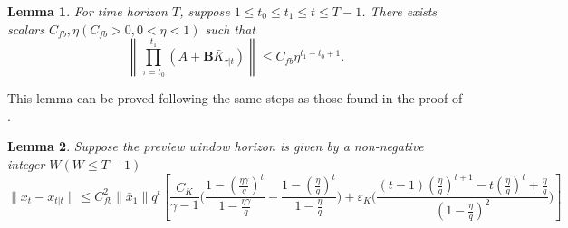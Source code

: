 \documentclass{article}
\newtheorem{lemma}{Lemma}
\begin{document}
\begin{lemma}\label{lemma:multGain}
    For time horizon $T$, suppose $1\leq t_{0} \leq t_{1}\leq t\leq T-1$. There exists scalars $C_{fb},\eta(C_{fb}>0,0<\eta<1)$ such that
    \begin{equation}
        \left \| \prod_{\tau=t_{0}}^{t_{1}}(A+\mathbf{B}\bar{K}_{\tau|t})  \right\| \leq C_{fb}\eta^{t_{1}-t_{0}+1}.
    \end{equation}
\end{lemma}
This lemma can be proved following the same steps as those found in the proof of \cite[Appendix E,Proposition 2]{zhang_regret_2021}.
\begin{lemma}
    Suppose the preview window horizon is given by a non-negative integer $W(W \leq T-1)$
    \begin{equation}
        \|x_{t}-x_{t|t}\| \leq C_{fb}^{2}\|\bar{x}_{1}\|q^{t}[\frac{C_{K}}{\gamma-1}\bigg(\frac{1-(\frac{\eta\gamma}{q})^{t}}{1-\frac{\eta\gamma}{q}} - \frac{1-(\frac{\eta}{q})^{t}}{1-\frac{\eta}{q}} \bigg)+\varepsilon_{K}\bigg(\frac{(t-1)(\frac{\eta}{q})^{t+1}-t(\frac{\eta}{q})^{t}+\frac{\eta}{q}}{(1-\frac{\eta}{q})^{2}}\bigg)]
    \end{equation}
\end{lemma}
\end{document}
